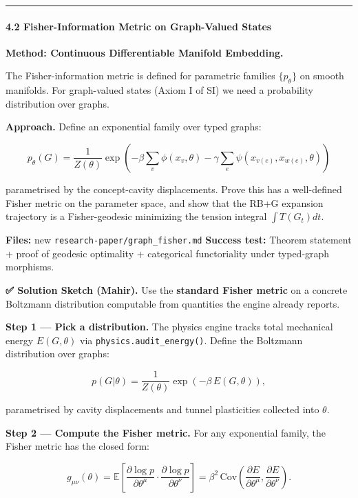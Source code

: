 \documentclass[
  11pt,
  a4paper,
]{article}
\begin{document}
\begin{center}\rule{0.5\linewidth}{0.5pt}\end{center}

\paragraph{4.2 Fisher-Information Metric on Graph-Valued
States}\label{fisher-information-metric-on-graph-valued-states}

\textbf{Method: Continuous Differentiable Manifold Embedding.}

The Fisher-information metric is defined for parametric families
\(\{p_\theta\}\) on smooth manifolds. For graph-valued states (Axiom I
of SI) we need a probability distribution over graphs.

\textbf{Approach.} Define an exponential family over typed graphs:

\[
p_\theta(G) = \frac{1}{Z(\theta)} \exp\left(-\beta \sum_v \phi(x_v, \theta) - \gamma \sum_e \psi(x_{v(e)}, x_{w(e)}, \theta)\right)
\]

parametrised by the concept-cavity displacements. Prove this has a
well-defined Fisher metric on the parameter space, and show that the
RB+G expansion trajectory is a Fisher-geodesic minimizing the tension
integral \(\int T(G_t) dt\).

\textbf{Files:} new \texttt{research-paper/graph\_fisher.md}
\textbf{Success test:} Theorem statement + proof of geodesic optimality
+ categorical functoriality under typed-graph morphisms.

\textbf{✅ Solution Sketch (Mahir).} Use the \textbf{standard Fisher
metric} on a concrete Boltzmann distribution computable from quantities
the engine already reports.

\textbf{Step 1 --- Pick a distribution.} The physics engine tracks total
mechanical energy \(E(G, \theta)\) via \texttt{physics.audit\_energy()}.
Define the Boltzmann distribution over graphs:

\[
p(G | \theta) = \frac{1}{Z(\theta)} \exp\left(-\beta \, E(G, \theta)\right),
\]

parametrised by cavity displacements and tunnel plasticities collected
into \(\theta\).

\textbf{Step 2 --- Compute the Fisher metric.} For any exponential
family, the Fisher metric has the closed form:

\[
g_{\mu\nu}(\theta) = \mathbb{E}\!\left[\frac{\partial \log p}{\partial \theta^\mu} \cdot \frac{\partial \log p}{\partial \theta^\nu}\right] = \beta^2 \, \mathrm{Cov}\!\left(\frac{\partial E}{\partial \theta^\mu}, \frac{\partial E}{\partial \theta^\nu}\right).
\]
\end{document}
